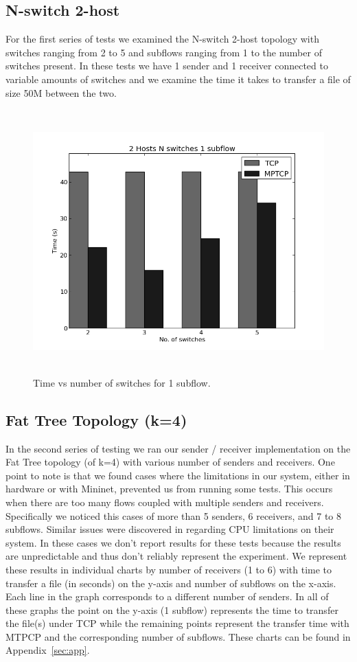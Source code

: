 \documentclass[10pt]{report}
\begin{document}
\subsection{N-switch 2-host}
\label{sub:res1}
For the first series of tests we examined the N-switch 2-host topology
with switches ranging from 2 to 5 and subflows ranging from 1 to the
number of switches present. In these tests we have 1 sender and 1
receiver connected to variable amounts of switches and we examine the
time it takes to transfer a file of size 50M between the two.

\begin{figure}[hb]
  \includegraphics[width=\textwidth,height=4in]{images/hist_all.png}
  \caption{Time vs number of switches for 1 subflow.}
  \label{fig:swvt}
\end{figure}

\subsection{Fat Tree Topology (k=4)}
\label{sub:res2}
In the second series of testing we ran our sender / receiver
implementation on the Fat Tree topology (of k=4) with various number of senders
and receivers. One point to note is that we found cases where the
limitations in our system, either in hardware or with Mininet,
prevented us from running some tests. This occurs when there are too
many flows coupled with multiple senders and receivers. Specifically
we noticed this cases of more than 5 senders, 6 receivers, and 7 to 8
subflows. Similar issues were discovered in \cite{datacenter}
regarding CPU limitations on their system. In these cases we don't
report results for these tests because the results are unpredictable
and thus don't reliably represent the experiment. We represent these
results in individual charts by number of receivers (1 to 6) with time
to transfer a file (in seconds) on the y-axis and number of subflows
on the x-axis. Each line in the graph corresponds to a different
number of senders. In all of these graphs the point on the y-axis (1
subflow) represents the time to transfer the file(s) under TCP while
the remaining points represent the transfer time with MTPCP and the
corresponding number of subflows. These charts can be found in
Appendix~\ref{sec:app}. 
\end{document}
